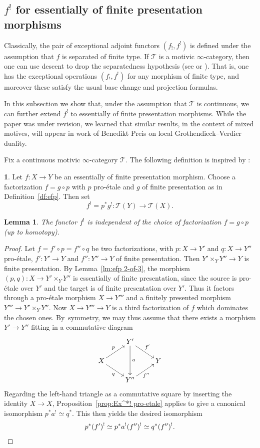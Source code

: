 \documentclass[11pt]{article}
\numberwithin{equation}{section}\renewcommand{\encodingdefault}{TU}
\newcommand{\T}{\mathscr T}
\newtheorem{lm}[thm]{Lemma}
\theoremstyle{remark}
\theoremstyle{definition}
\newtheorem{num}[thm]{}
\numberwithin{equation}{thm}
\begin{document}
\subsection{\texorpdfstring{$f^!$}{f\textasciicircum!} for essentially of finite presentation morphisms}

Classically, the pair of exceptional adjoint functors $(f_!,f^!)$ is defined under the assumption that $f$ is separated of finite type.
If $\T$ is a motivic $\infty$-category, then one can use descent to drop the separatedness hypothesis (see \cite[Rem.\,C.14]{HoyoisLefschetz} or \cite[App.\,A]{KhanVirtual}).
That is, one has the exceptional operations $(f_!,f^!)$ for any morphism of finite type, and moreover these satisfy the usual base change and projection formulas.

In this subsection we show that, under the assumption that $\T$ is continuous, we can further extend $f^!$ to essentially of finite presentation morphisms.
While the paper was under revision, we learned that similar results, in the context of mixed motives, will appear in work of Benedikt Preis on local Grothendieck--Verdier duality.

Fix a continuous motivic $\infty$-category $\T$.
The following definition is inspired by \cite[2.2.12]{BBD}:

\begin{num}\label{num:f^! efp}
Let $f : X \to Y$ be an essentially of finite presentation morphism.
Choose a factorization $f = g \circ p$ with $p$ pro-étale and $g$ of finite presentation as in Definition~\ref{df:efp}.
Then set
\[
f^! = p^*g^! : \T(Y) \to \T(X).
\]
\end{num}

\begin{lm}\label{lm:indepf^!}
The functor $f^!$ is independent of the choice of factorization $f = g \circ p$ (up to homotopy).
\end{lm}
\begin{proof}
Let $f = f' \circ p = f'' \circ q$ be two factorizations, with $p : X \to Y'$ and $q : X \to Y''$ pro-étale, $f' : Y' \to Y$ and $f'' : Y'' \to Y$ of finite presentation.
Then $Y' \times_Y Y'' \to Y$ is finite presentation.
By Lemma~\ref{lm:efp 2-of-3}, the morphism $(p,q) : X \to Y' \times_Y Y''$ is essentially of finite presentation, since the source is pro-étale over $Y'$ and the target is of finite presentation over $Y'$.
Thus it factors through a pro-étale morphism $X \to Y'''$ and a finitely presented morphism $Y''' \to Y' \times_Y Y''$.
Now $X \to Y''' \to Y$ is a third factorization of $f$ which dominates the chosen ones.
By~symmetry, we may thus assume that there exists a morphism $Y' \to Y''$ fitting in a commutative diagram
\[
\xymatrix@R=.5cm{
& Y'\ar[dd]^-{a}\ar[rd]^{f'} &
\\
X \ar[ru]^{p}\ar[rd]_{q} & & Y\\
& Y'' \ar[ru]_{\!\!f''} &
}
\]
Regarding the left-hand triangle as a commutative square by inserting the identity $X \to X$, Proposition~\ref{prop:Ex^*! pro-etale} applies to give a canonical isomorphism $p^*a^! \simeq q^*$.
This then yields the desired isomorphism
\[
p^*(f')^!
\simeq p^*a^!(f'')^!
\simeq q^*(f'')^!.\qedhere
\]
\end{proof}
\end{document}
